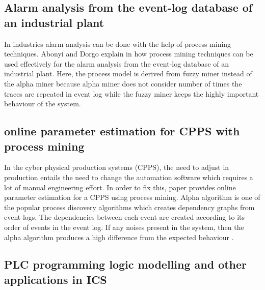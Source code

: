 \begin{bibunit}
   \subsection{ Alarm analysis from the event-log database of an industrial plant}
   
   In industries alarm analysis can be done with the help of process mining techniques.  Abonyi and Dorgo explain in \cite{paper4} how process mining techniques can be used effectively for the alarm analysis from the event-log database of an industrial plant. Here, the process model is derived from fuzzy miner instead of the alpha miner \cite{van2004workflow} because alpha miner does not consider number of times the traces are repeated in event log while the fuzzy miner keeps the highly important behaviour of the system.
   
   \subsection{online parameter estimation for CPPS with process mining}
   
   In the cyber physical production systems (CPPS), the need to adjust in production entails the need to change the automation software which requires a lot of manual engineering effort. In order to fix this, paper \cite{paper5} provides online parameter estimation for a CPPS  using process mining. Alpha algorithm is one of the popular process discovery algorithms which creates dependency graphs from event logs. The dependencies between each event are created according to its order of events in the event log. If any noises present in the system, then the alpha algorithm produces a high difference from the expected behaviour \cite{paper5}.
   
   \subsection{PLC programming logic modelling and other applications in ICS }
   

\end{bibunit}
